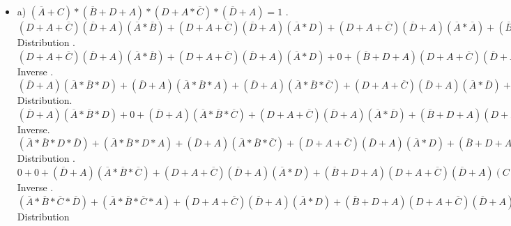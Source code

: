 \documentclass{article}
\begin{document}
\begin{itemize}
\large
    \item a) $(\overline{A} + C) * (\overline{B} + D + A) * (D + A * \overline{C}) * (\overline{D} + A) = 1$ . $(D + A + \overline{C})(\overline{D} + A)(\overline{A} * \overline{B}) + (D + A + \overline{C})(\overline{D} + A)(\overline{A} * D) + (D + A + \overline{C})(\overline{D} + A)(\overline{A} * \overline{A}) +
    (\overline{B} + D + A)(D + A + \overline{C})(\overline{D} + A)*C$ Distribution .  $(D + A + \overline{C})(\overline{D} + A)(\overline{A} * \overline{B}) + (D + A + \overline{C})(\overline{D} + A)(\overline{A} * D) + 0 +
    (\overline{B} + D + A)(D + A + \overline{C})(\overline{D} + A)*C$ Inverse . $(\overline{D} + A)(\overline{A} * \overline{B} * D) + 
    (\overline{D} + A)(\overline{A} * \overline{B} * A) + 
    (\overline{D} + A)(\overline{A} * \overline{B} * \overline{C}) + 
    (D + A + \overline{C})(\overline{D} + A)(\overline{A} * \overline{D}) + 
    (\overline{B} + D + A)(D + A + \overline{C})(\overline{D} + A)(C)$ Distribution. $(\overline{D} + A)(\overline{A} * \overline{B} * D) + 
    0 + 
    (\overline{D} + A)(\overline{A} * \overline{B} * \overline{C}) + 
    (D + A + \overline{C})(\overline{D} + A)(\overline{A} * \overline{D}) + 
    (\overline{B} + D + A)(D + A + \overline{C})(\overline{D} + A)(C)$ Inverse. $(\overline{A} * \overline{B} * D * \overline{D}) + 
    (\overline{A} * \overline{B} * D * A) +
    (\overline{D} + A)(\overline{A} * \overline{B} * \overline{C}) +
    (D + A + \overline{C})(\overline{D} + A)(\overline{A} * D) +
    (\overline{B} + D + A)(D + A + \overline{C})(\overline{D} + A)(C)$ Distribution . $0 + 
    0 +
    (\overline{D} + A)(\overline{A} * \overline{B} * \overline{C}) +
    (D + A + \overline{C})(\overline{D} + A)(\overline{A} * D) +
    (\overline{B} + D + A)(D + A + \overline{C})(\overline{D} + A)(C)$ Inverse . $(\overline{A} * \overline{B} * \overline{C} * \overline{D}) +
    (\overline{A} * \overline{B} * \overline{C} * A) +
    (D + A + \overline{C})(\overline{D} + A)(\overline{A} * D) +
    (\overline{B} + D + A)(D + A + \overline{C})(\overline{D} + A)(C)$ Distribution \newline

\end{itemize}
\end{document}
